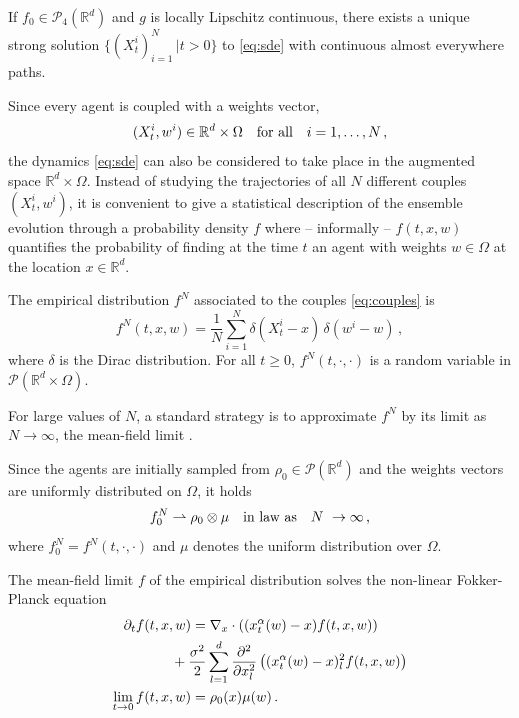 \documentclass[letterpaper, 10 pt, conference]{ieeeconf}  %
\begin{document}
If $f_0 \in \mathcal P_4(\mathbb{R}^d)$ and $g$ is locally Lipschitz continuous, there exists a unique strong solution $\{ (X^i_t)_{i=1}^N \, | t >0\}$ to \eqref{eq:sde} with continuous almost everywhere paths. 

Since every agent is coupled with a weights vector, 
\begin{equation} 
(X_t^i, w^i) \in \mathbb{R}^d \times \Omega\quad \textup{for all} \quad  i=1, \dots,N\,,
\label{eq:couples}
\end{equation}
the dynamics \eqref{eq:sde} can also be considered to take place in the augmented space $\mathbb{R}^d \times \Omega$. Instead of studying the trajectories of all $N$ different couples $(X_t^i, w^i)$, it is convenient to give a statistical description of the ensemble evolution through a probability density $f$ where -- informally -- $f(t,x,w)$ quantifies the probability of finding at the time $t$ an agent with weights $w \in \Omega$ at the location $x \in \mathbb{R}^d$. 

The empirical distribution $f^N$ associated to the couples \eqref{eq:couples} is
\begin{equation}
f^N(t, x,w) =\frac 1 N \sum_{i=1}^N \delta({X_t^i}-x) \, \delta({w^i}-w)\, ,
\label{eq:emp}
\end{equation}
where $\delta$ is the Dirac distribution. For all $t\geq0$, $f^N(t, \cdot, \cdot)$ is a random variable in $\mathcal{P}(\mathbb{R}^d \times \Omega)$. 

For large values of $N$, a standard strategy is to approximate $f^N$ by its limit as $N \to \infty$, the mean-field limit \cite{bolley2011stochastic}. 

Since the agents are initially sampled from $\rho_0 \in \mathcal{P}(\mathbb{R}^d)$ and the weights vectors are uniformly distributed on $\Omega$, it holds
\begin{equation}
f_0^N \rightharpoonup \rho_0 \otimes \mu \quad \textup{in law as} \quad N\ \to \infty\,,
\end{equation}
where  $f_0^N = f^N(t, \cdot, \cdot)$ and $\mu$ denotes the uniform distribution over $\Omega$. 

The mean-field limit $f$ of the empirical distribution solves the non-linear Fokker-Planck equation
\begin{equation}
\begin{split}
\partial_t f(t,x,w) &= \nabla_x \cdot \left( (x_t^\alpha(w) - x) f(t, x, w) \right) \\
&\hspace{-5mm}+ \frac{\sigma^2}2 \sum_{l=1}^d \frac{\partial^2}{\partial x^2_l} \left(( x^\alpha_t(w) - x)_l^2 f(t, x, w)  \right)\\
\lim_{t\to 0} f(t,x,w) &= \rho_0(x) \mu(w)\,.
\label{eq:mf}
\end{split}
\end{equation}
\end{document}

